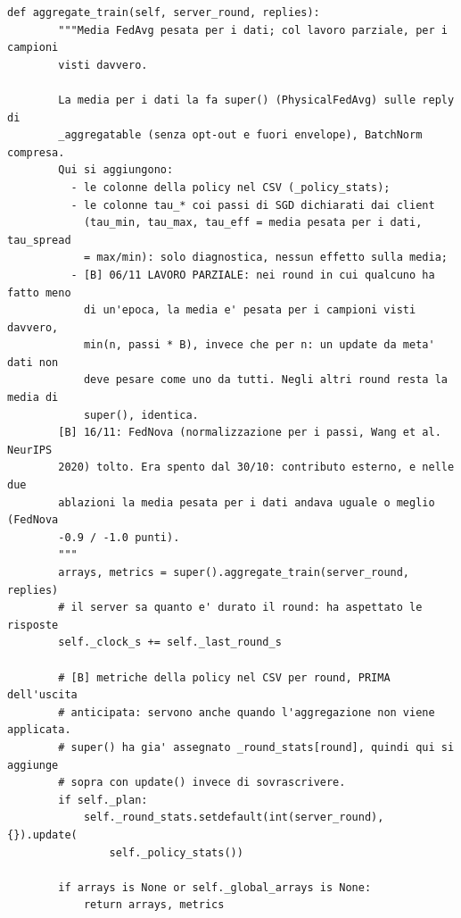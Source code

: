 \documentclass[11pt,a4paper]{article}
\begin{document}
\begin{lstlisting}[style=py,firstnumber=965,caption={\texttt{tesifl/strategies/sage\_smart.py}, lines 965--1056}]
    def aggregate_train(self, server_round, replies):
        """Media FedAvg pesata per i dati; col lavoro parziale, per i campioni
        visti davvero.

        La media per i dati la fa super() (PhysicalFedAvg) sulle reply di
        _aggregatable (senza opt-out e fuori envelope), BatchNorm compresa.
        Qui si aggiungono:
          - le colonne della policy nel CSV (_policy_stats);
          - le colonne tau_* coi passi di SGD dichiarati dai client
            (tau_min, tau_max, tau_eff = media pesata per i dati, tau_spread
            = max/min): solo diagnostica, nessun effetto sulla media;
          - [B] 06/11 LAVORO PARZIALE: nei round in cui qualcuno ha fatto meno
            di un'epoca, la media e' pesata per i campioni visti davvero,
            min(n, passi * B), invece che per n: un update da meta' dati non
            deve pesare come uno da tutti. Negli altri round resta la media di
            super(), identica.
        [B] 16/11: FedNova (normalizzazione per i passi, Wang et al. NeurIPS
        2020) tolto. Era spento dal 30/10: contributo esterno, e nelle due
        ablazioni la media pesata per i dati andava uguale o meglio (FedNova
        -0.9 / -1.0 punti).
        """
        arrays, metrics = super().aggregate_train(server_round, replies)
        # il server sa quanto e' durato il round: ha aspettato le risposte
        self._clock_s += self._last_round_s

        # [B] metriche della policy nel CSV per round, PRIMA dell'uscita
        # anticipata: servono anche quando l'aggregazione non viene applicata.
        # super() ha gia' assegnato _round_stats[round], quindi qui si aggiunge
        # sopra con update() invece di sovrascrivere.
        if self._plan:
            self._round_stats.setdefault(int(server_round), {}).update(
                self._policy_stats())

        if arrays is None or self._global_arrays is None:
            return arrays, metrics


\end{lstlisting}
\end{document}

